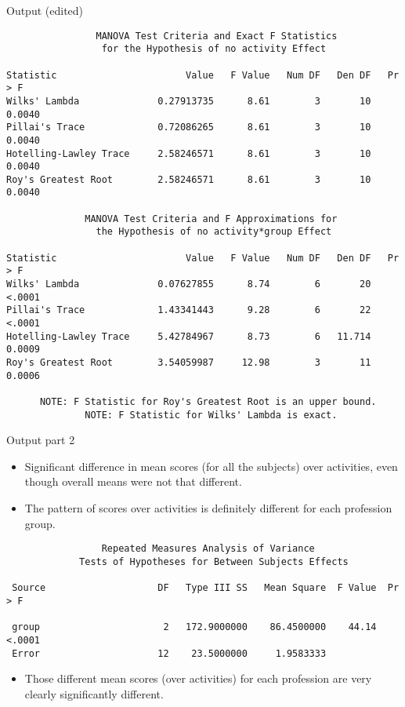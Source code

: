\documentclass[pdf]{prosper}
\begin{document}
\begin{slide}{Output (edited)}

{\scriptsize
\begin{verbatim}
                MANOVA Test Criteria and Exact F Statistics
                 for the Hypothesis of no activity Effect
 
Statistic                       Value   F Value   Num DF   Den DF   Pr > F
Wilks' Lambda              0.27913735      8.61        3       10   0.0040
Pillai's Trace             0.72086265      8.61        3       10   0.0040
Hotelling-Lawley Trace     2.58246571      8.61        3       10   0.0040
Roy's Greatest Root        2.58246571      8.61        3       10   0.0040

              MANOVA Test Criteria and F Approximations for
                the Hypothesis of no activity*group Effect
 
Statistic                       Value   F Value   Num DF   Den DF   Pr > F
Wilks' Lambda              0.07627855      8.74        6       20   <.0001
Pillai's Trace             1.43341443      9.28        6       22   <.0001
Hotelling-Lawley Trace     5.42784967      8.73        6   11.714   0.0009
Roy's Greatest Root        3.54059987     12.98        3       11   0.0006

      NOTE: F Statistic for Roy's Greatest Root is an upper bound.
              NOTE: F Statistic for Wilks' Lambda is exact.
\end{verbatim}
}

\end{slide}

\begin{slide}{Output part 2}


\begin{itemize}
\item Significant difference in mean scores (for all the subjects) over activities, even though overall means were not that different.
\item The pattern of scores over activities is definitely different for each profession group.
\end{itemize}




{\scriptsize
\begin{verbatim}
                 Repeated Measures Analysis of Variance
             Tests of Hypotheses for Between Subjects Effects

 Source                    DF   Type III SS   Mean Square  F Value  Pr > F

 group                      2   172.9000000    86.4500000    44.14  <.0001
 Error                     12    23.5000000     1.9583333                 

\end{verbatim}
}

\begin{itemize}

\item Those different mean scores (over activities) for each profession are very clearly significantly different.

\end{itemize}
  
\end{slide}
\end{document}
